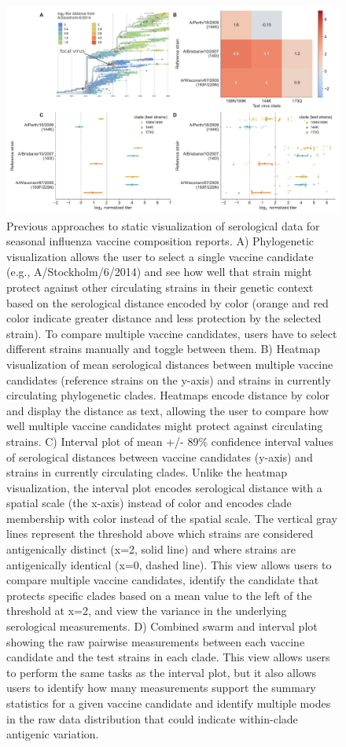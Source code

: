 \documentclass[utf8]{FrontiersinHarvard} %
\begin{document}
\begin{figure}[h!]
  \begin{center}
    \includegraphics[width=\textwidth]{figures/figure-1-static-titer-visualizations}
  \end{center}
  \caption{
    Previous approaches to static visualization of serological data for seasonal influenza vaccine composition reports.
A) Phylogenetic visualization \citep{NeherBedford2018} allows the user to select a single vaccine candidate (e.g., A/Stockholm/6/2014) and see how well that strain might protect against other circulating strains in their genetic context based on the serological distance encoded by color (orange and red color indicate greater distance and less protection by the selected strain).
To compare multiple vaccine candidates, users have to select different strains manually and toggle between them.
B) Heatmap visualization of mean serological distances between multiple vaccine candidates (reference strains on the y-axis) and strains in currently circulating phylogenetic clades.
Heatmaps encode distance by color and display the distance as text, allowing the user to compare how well multiple vaccine candidates might protect against circulating strains.
C) Interval plot of mean +/- 89\% confidence interval values of serological distances between vaccine candidates (y-axis) and strains in currently circulating clades.
Unlike the heatmap visualization, the interval plot encodes serological distance with a spatial scale (the x-axis) instead of color and encodes clade membership with color instead of the spatial scale.
The vertical gray lines represent the threshold above which strains are considered antigenically distinct (x=2, solid line) and where strains are antigenically identical (x=0, dashed line).
This view allows users to compare multiple vaccine candidates, identify the candidate that protects specific clades based on a mean value to the left of the threshold at x=2, and view the variance in the underlying serological measurements.
D) Combined swarm and interval plot showing the raw pairwise measurements between each vaccine candidate and the test strains in each clade.
This view allows users to perform the same tasks as the interval plot, but it also allows users to identify how many measurements support the summary statistics for a given vaccine candidate and identify multiple modes in the raw data distribution that could indicate within-clade antigenic variation.
}\label{fig:1}
\end{figure}
\end{document}

